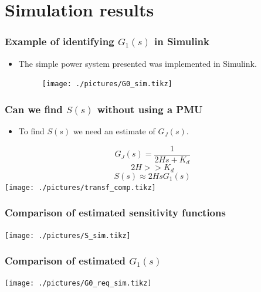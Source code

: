 \section{Simulation results}
\begin{frame}
		\frametitle{Example of identifying $G_1(s)$ in Simulink }
	\begin{itemize}
			\item The simple power system presented was implemented in Simulink.
			\begin{figure}
					\texttt{[image: ./pictures/G0\_sim.tikz]}
			\end{figure}
	\end{itemize}
\end{frame}
\begin{frame}
		\frametitle{Can we find $S(s)$ without using a PMU}
	\begin{itemize}[<+->]
		\item To find $S(s)$ we need an estimate of $G_J(s)$.
\end{itemize}
				\begin{equation}
						G_J(s) = \frac{1}{2Hs+ K_d}
				\end{equation}
				\begin{equation}
						2H>>K_d
				\end{equation}
			\begin{equation}\label{eq:S_ident}
				S(s) \approx 2HsG_1(s)
			\end{equation}
		\texttt{[image: ./pictures/transf\_comp.tikz]}
\end{frame}
\begin{frame}
	\frametitle{Comparison of estimated sensitivity functions}
		\texttt{[image: ./pictures/S\_sim.tikz]}
\end{frame}
\begin{frame}
		\frametitle{Comparison of estimated $G_1(s)$}
		\texttt{[image: ./pictures/G0\_req\_sim.tikz]}
\end{frame}

